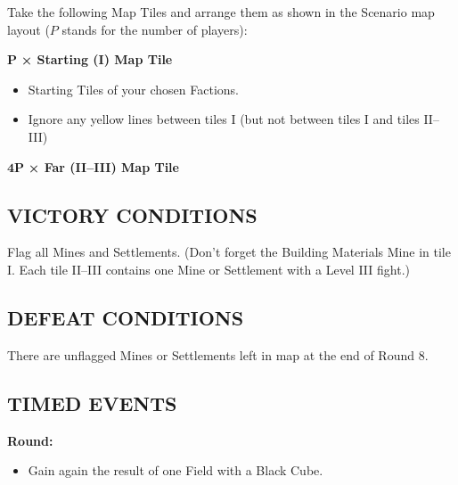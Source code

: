 \begin{multicols*}{2}
Take the following Map Tiles and arrange them as shown in the Scenario map layout ($P$ stands for the number of players):

$\boldsymbol{P}$ \textbf{× Starting (I) Map Tile}
\begin{itemize}
  \item Starting Tiles of your chosen Factions.
  \item Ignore any yellow lines between tiles I (but not between tiles I and tiles II--III)
\end{itemize}

$\boldsymbol{4 P}$ \textbf{× Far (II--III) Map Tile}

\subsection*{\MakeUppercase{Victory Conditions}}

Flag all Mines and Settlements. (Don't forget the Building Materials Mine in tile I. Each tile II--III contains one Mine or Settlement with a Level III fight.)

\subsection*{\MakeUppercase{Defeat Conditions}}

There are unflagged Mines or Settlements left in map at the end of Round 8.

\subsection*{\MakeUppercase{Timed Events}}

\textbf{ Round:}
\begin{itemize}
  \item Gain again the result of one Field with a Black Cube.
\end{itemize}


\end{multicols*}
